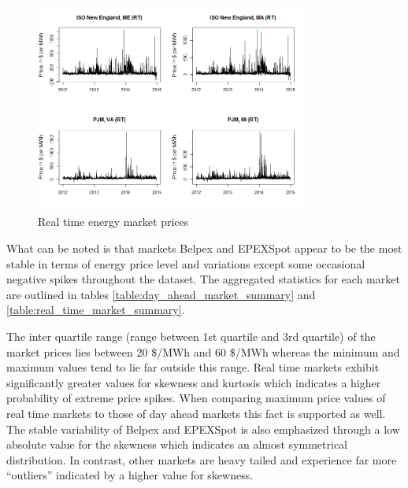 \begin{figure}[htbp]
	\centering
		\includegraphics[width=0.8\textwidth]{figures/data_analysis/rt_energy_markets_2012_2014.png}
	\caption{Real time energy market prices}
	\label{fig:rt_energy_markets_2012_2014}
\end{figure}

What can be noted is that markets Belpex and EPEXSpot appear to be the most stable in terms of energy price level and variations except some occasional negative spikes throughout the dataset. The aggregated statistics for each market are outlined in tables \ref{table:day_ahead_market_summary} and \ref{table:real_time_market_summary}. 

The inter quartile range (range between 1st quartile and 3rd quartile) of the market prices lies between 20 \$/MWh and 60 \$/MWh whereas the minimum and maximum values tend to lie far outside this range. Real time markets exhibit significantly greater values for skewness and kurtosis which indicates a higher probability of extreme price spikes. When comparing maximum price values of real time markets to those of day ahead markets this fact is supported as well. 
The stable variability of Belpex and EPEXSpot is also emphasized through a low absolute value for the skewness which indicates an almost symmetrical distribution. In contrast, other markets are heavy tailed and experience far more "`outliers"' indicated by a higher value for skewness. 




